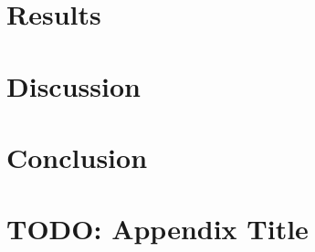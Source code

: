 \documentclass[12pt, twoside]{report}
\begin{document}
\chapter{Results}


\chapter{Discussion}


\chapter{Conclusion}


\appendix
\chapter{TODO: Appendix Title}



\end{document}
